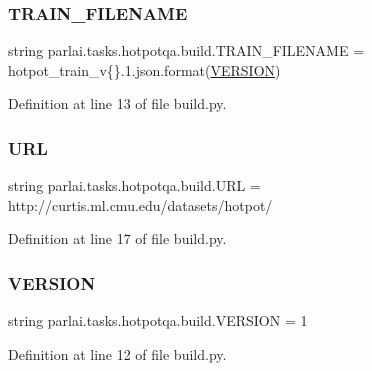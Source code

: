 \subsubsection{\texorpdfstring{T\+R\+A\+I\+N\+\_\+\+F\+I\+L\+E\+N\+A\+ME}{TRAIN\_FILENAME}}
{\footnotesize\ttfamily string parlai.\+tasks.\+hotpotqa.\+build.\+T\+R\+A\+I\+N\+\_\+\+F\+I\+L\+E\+N\+A\+ME = \textquotesingle{}hotpot\+\_\+train\+\_\+v\{\}.\+1.json\textquotesingle{}.format(\hyperlink{namespaceparlai_1_1tasks_1_1hotpotqa_1_1build_a57a5627d2111821eb32c42f113773b1a}{V\+E\+R\+S\+I\+ON})}



Definition at line 13 of file build.\+py.

\mbox{\label{namespaceparlai_1_1tasks_1_1hotpotqa_1_1build_a2438adc99c7352b4e33e6153b45e24e7}} 
\subsubsection{\texorpdfstring{U\+RL}{URL}}
{\footnotesize\ttfamily string parlai.\+tasks.\+hotpotqa.\+build.\+U\+RL = \textquotesingle{}http\+://curtis.\+ml.\+cmu.\+edu/datasets/hotpot/\textquotesingle{}}



Definition at line 17 of file build.\+py.

\mbox{\label{namespaceparlai_1_1tasks_1_1hotpotqa_1_1build_a57a5627d2111821eb32c42f113773b1a}} 
\subsubsection{\texorpdfstring{V\+E\+R\+S\+I\+ON}{VERSION}}
{\footnotesize\ttfamily string parlai.\+tasks.\+hotpotqa.\+build.\+V\+E\+R\+S\+I\+ON = \textquotesingle{}1\textquotesingle{}}



Definition at line 12 of file build.\+py.


